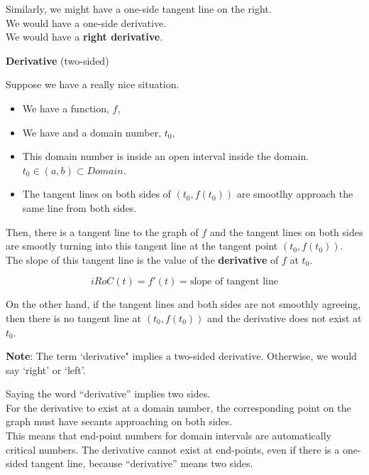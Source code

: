 \documentclass{ximera}
\begin{document}
Similarly, we might have a one-side tangent line on the right.  \\

We would have a one-side derivative. \\


We would have a \textbf{right derivative}.









\begin{definition} \textbf{\textcolor{green!50!black}{Derivative}}  (two-sided)


Suppose we have a really nice situation.


\begin{itemize}
\item We have a function, $f$, 
\item We have and a domain number, $t_0$, 
\item This domain number is inside an open interval inside the domain.  $t_0 \in (a, b) \subset Domain$. 
\item The tangent lines on both sides of $(t_0, f(t_0))$ are smootlhy approach the same line from both sides.
\end{itemize}

Then, there is a tangent line to the graph of $f$ and the tangent lines on both sides are smootly turning into this tangent line at the tangent point $(t_0, f(t_0))$. \\

The slope of this tangent line is the value of the \textbf{derivative} of $f$ at $t_0$.

\[
iRoC(t) =f'(t) = \text{slope of tangent line}
\]


On the other hand, if the tangent lines and both sides are not smoothly agreeing, then there is no tangent line at $(t_0, f(t_0))$ and the derivative does not exist at $t_0$.   

\end{definition}

\textbf{Note}: The term `derivative" implies a two-sided derivative.  Otherwise, we would say `right' or `left'. \\




\begin{warning}

Saying the word ``derivative'' implies two sides. \\

For the derivative to exist at a domain number, the corresponding point on the graph must have secants approaching on both sides. \\


This means that end-point numbers for domain intervals are automatically critical numbers.  The derivative cannot exist at end-points, even if there is a one-sided tangent line, because ``derivative'' means two sides. \\

\end{warning}
\end{document}
